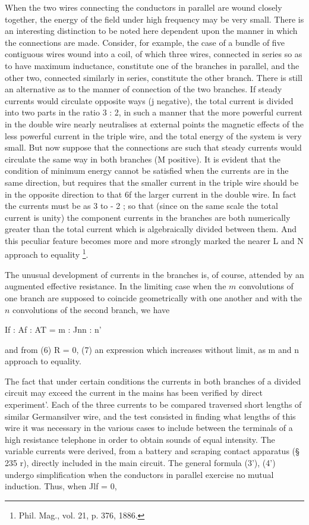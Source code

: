 When the two wires connecting the conductors in parallel are wound closely
together, the energy of the field under high frequency may be very small.
There is an interesting distinction to be noted here dependent upon the manner
in which the connections are made.  Consider, for example, the case of a bundle
of five contiguous wires wound into a coil, of which three wires, connected in
series so as to have maximum inductance, constitute one of the branches in
parallel, and the other two, connected similarly in series, constitute the
other branch. There is still an alternative as to the manner of connection of
the two branches.  If steady currents would circulate opposite ways
(j negative), the total current is divided into two parts in the ratio 3 : 2, in
such a manner that the more powerful current in the double wire nearly
neutralises at external points the magnetic effects of the less powerful
current in the triple wire, and the total energy of the system is very small.
But now suppose that the connections are such that steady currents would
circulate the same way in both branches (M positive). It is evident that the
condition of minimum energy cannot be satisfied when the currents are in the
same direction, but requires that the smaller current in the triple wire should
be in the opposite direction to that 6f the larger current in the double wire.
In fact the currents must be as
3 to - 2 ; so that
(since on the same scale the total current is unity) the component currents in
the branches are both numerically greater than the total current which is
algebraically divided between them. And this peculiar feature becomes more and
more strongly marked the nearer
L and N approach to equality
\footnote{Phil. Mag., vol. 21, p. 376, 1886.}.

The unusual development of currents in the branches is, of course, attended by
an augmented effective resistance. In the limiting case when the
\(m\)
convolutions of one branch are supposed to coincide geometrically with one
another and with the
\(n\)
convolutions of the second branch, we have

If : Af : AT = m : Jnn : n'

and from (6) R = 0, (7)
an expression which increases without limit, as m and n approach to equality.


The fact that under certain conditions the currents in both branches of a
divided circuit may exceed the current in the mains has been verified by direct
experiment'. Each of the three currents to be compared traversed short lengths
of similar Germansilver wire, and the test consisted in finding what lengths of
this wire it was necessary in the various cases to include between the
terminals of a high resistance telephone in order to obtain sounds of equal
intensity. The variable currents were derived, from a battery and scraping
contact apparatus (§ 235 r), directly included in the main circuit.  The general
formula (3'), (4') undergo simplification when the conductors in parallel
exercise no mutual induction. Thus, when Jlf = 0,

